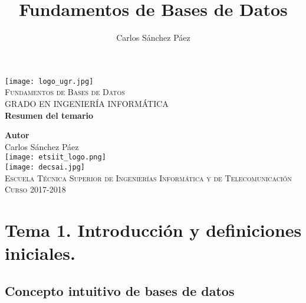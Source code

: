 \documentclass[12pt,spanish]{article}
\title{Fundamentos de Bases de Datos}
\author{Carlos Sánchez Páez}
\begin{document}
\begin{titlepage}

\newlength{\centeroffset}
\setlength{\centeroffset}{-0.5\oddsidemargin}
\addtolength{\centeroffset}{0.5\evensidemargin}
\thispagestyle{empty}

\noindent\hspace*{\centeroffset}
\begin{minipage}{\textwidth}

\centering
\texttt{[image: logo\_ugr.jpg]}\\[1.4cm]

\textsc{ \Large Fundamentos de Bases de Datos\\[0.2cm]}
\textsc{GRADO EN INGENIERÍA INFORMÁTICA}\\[1cm]

{\Huge\bfseries Resumen del temario\\}
\end{minipage}

\vspace{1.5cm}
\noindent\hspace*{\centeroffset}
\begin{minipage}{\textwidth}
\centering

\textbf{Autor}\\ {Carlos Sánchez Páez}\\[2.5ex]
\texttt{[image: etsiit\_logo.png]}\\[0.1cm]
\vspace{1.5cm}
\texttt{[image: decsai.jpg]}\\[0.1cm]
\vspace{1cm}
\textsc{Escuela Técnica Superior de Ingenierías Informática y de Telecomunicación}\\
\vspace{1cm}
\textsc{Curso 2017-2018}
\end{minipage}
\end{titlepage}
\thispagestyle{empty}
\newpage
\tableofcontents{}
\newpage
\listoffigures
\thispagestyle{empty}
\newpage

\section{Tema 1. Introducción y definiciones iniciales.}

\subsection{Concepto intuitivo de bases de datos}
\end{document}
